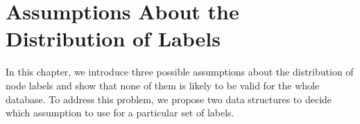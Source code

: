 \chapter{Assumptions About the Distribution of Labels}
\label{chap:label-assumptions}

\begin{aboutchapter}
In this chapter, we introduce three possible assumptions about the distribution
of node labels and show that none of them is likely to be valid for the
whole database.
To address this problem, we propose two data structures to decide which
assumption to use for a particular set of labels.
\end{aboutchapter}

%
%
%
%
%

